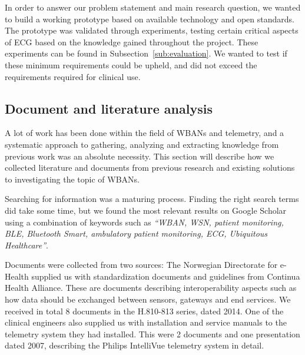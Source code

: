 In order to answer our problem statement and main research question, we wanted to build a working prototype based on available technology and open standards. The prototype was validated through experiments, testing certain critical aspects of ECG based on the knowledge gained throughout the project. These experiments can be found in Subsection~\ref{sub:evaluation}. We wanted to test if these minimum requirements could be upheld, and did not exceed the requirements required for clinical use.



\subsection{Document and literature analysis} %
\label{sub:document_and_literature_analysis}

A lot of work has been done within the field of WBANs and telemetry, and a systematic approach to gathering, analyzing and extracting knowledge from previous work was an absolute necessity. This section will describe how we collected literature and documents from previous research and existing solutions to investigating the topic of WBANs.

Searching for information was a maturing process. Finding the right search terms did take some time, but we found the most relevant results on Google Scholar using a combination of keywords such as \textit{``WBAN, WSN, patient monitoring, BLE, Bluetooth Smart, ambulatory patient monitoring, ECG, Ubiquitous Healthcare''}.

Documents were collected from two sources: The Norwegian Directorate for e-Health supplied us with standardization documents and guidelines from Continua Health Alliance. These are documents describing interoperability aspects such as how data should be exchanged between sensors, gateways and end services. We received in total 8 documents in the H.810-813 series, dated 2014. One of the clinical engineers also supplied us with installation and service manuals to the telemetry system they had installed. This were 2 documents and one presentation dated 2007, describing the Philips IntelliVue telemetry system in detail.


